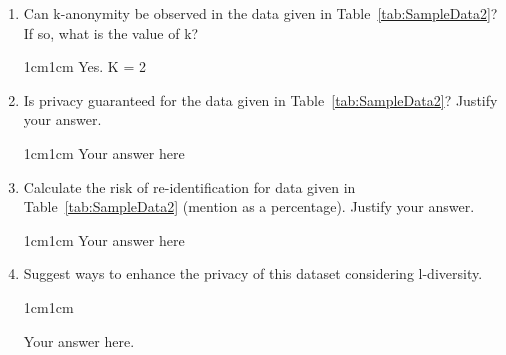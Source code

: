 \documentclass[11pt,letterpaper]{article}
\newenvironment{answer}{\em \color{blue} \begin{adjustwidth}{1cm}{1cm}}{\end{adjustwidth}}
\begin{document}
\begin{enumerate}
		\item Can k-anonymity be observed in the data given in Table~\ref{tab:SampleData2}? If so, what is the value of k?
		
		\begin{answer}
			Yes. K = 2
		\end{answer}
		
		\item Is privacy guaranteed for the data given in Table~\ref{tab:SampleData2}? Justify your answer.
		
		\begin{answer}
			Your answer here
		\end{answer}
		
		\item Calculate the risk of re-identification for data given in Table~\ref{tab:SampleData2} (mention as a percentage). Justify your answer.
		
		\begin{answer}
			Your answer here
		\end{answer}
		
		\item Suggest ways to enhance the privacy of this dataset considering l-diversity.
		
		\begin{answer}
			
			Your answer here.
			
		\end{answer}
		
	\end{enumerate}
	
\end{document}
